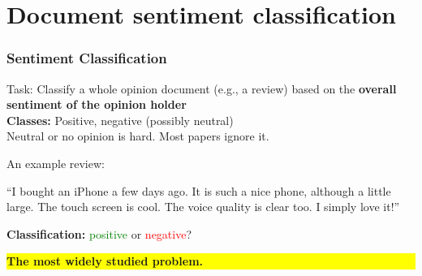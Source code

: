\documentclass[t]{beamer}
\begin{document}

\section{Document sentiment classification}


\begin{frame} \frametitle{Sentiment Classification} %

\begin{block}{Task:}
Classify a whole opinion document (e.g., a review) based on the
\textbf{overall sentiment of the opinion holder} \\ 
 
\vfill
\textbf{Classes:} Positive, negative (possibly neutral) \\
 Neutral or no opinion is hard. Most papers ignore it. 
\end{block}

\begin{block}{An example review:}

``I bought an iPhone a few days
ago. It is such a nice phone, although a little large. The touch
screen is cool. The voice quality is clear too. I simply love it!'' 

\textbf{Classification:} \textcolor{green}{positive} or \textcolor{red}{negative}?

\end{block}


\colorbox{yellow}{\parbox{0.9 \textwidth} {\textbf{The most widely studied problem.}}}



\end{frame} 
\end{document}

